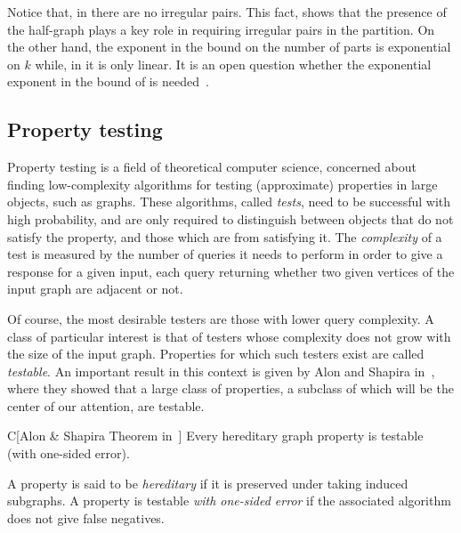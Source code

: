         Notice that, in  there are no irregular pairs.
        This fact, shows that the presence of the half-graph plays a key role in requiring irregular pairs in the partition.
        On the other hand, the exponent in the bound on the number of parts is exponential on $k$ while,
        in  it is only linear.
        It is an open question whether the exponential exponent in the bound of  is
        needed~\cite{julia_wolf_private_comunication}.

    \subsection{Property testing} \label{subsec:subsection_1.3}

        Property testing is a field of theoretical computer science, concerned about finding low-complexity algorithms
        for testing (approximate) properties in large objects, such as graphs.
        These algorithms, called \emph{tests}, need to be successful with high probability, and are only required to distinguish between objects
        that do not satisfy the property, and those which are  from satisfying it.
        The \emph{complexity} of a test is measured by the number of queries it needs to perform in order to give a response
        for a given input, each query returning whether two given vertices of the input graph are adjacent or not.

        Of course, the most desirable testers are those with lower query complexity.
        A class of particular interest is that of testers whose complexity does not grow with the size of the input
        graph.
        Properties for which such testers exist are called \emph{testable}.
        An important result in this context is given by Alon and Shapira
        in~\cite{a_characterization_of_the_natural_graph_properties_testable_with_one_sided_error}, where they
        showed that a large class of properties, a subclass of which will be the center of our attention, are testable.

        \begin{thm*}{C}[Alon \& Shapira Theorem in~\cite{a_characterization_of_the_natural_graph_properties_testable_with_one_sided_error}]
            \label{thm:alon_and_shapira_theorem}
            Every hereditary graph property is testable (with one-sided error).
        \end{thm*}

        A property is said to be \emph{hereditary} if it is preserved under taking induced subgraphs.
        A property is testable \emph{with one-sided error} if the associated algorithm does
        not give false negatives.

